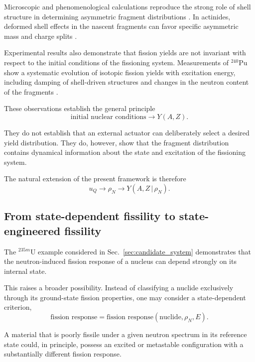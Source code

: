 Microscopic and phenomenological calculations reproduce the strong role of shell structure in determining asymmetric fragment distributions \cite{ScampsSimenel2018,Sadhukhan2022}. In actinides, deformed shell effects in the nascent fragments can favor specific asymmetric mass and charge splits \cite{ScampsSimenel2018}.

Experimental results also demonstrate that fission yields are not invariant with respect to the initial conditions of the fissioning system. Measurements of $^{240}$Pu show a systematic evolution of isotopic fission yields with excitation energy, including damping of shell-driven structures and changes in the neutron content of the fragments \cite{Ramos2026}.

These observations establish the general principle
\begin{equation}
\text{initial nuclear conditions}
\longrightarrow
Y(A,Z).
\end{equation}

They do not establish that an external actuator can deliberately select a desired yield distribution. They do, however, show that the fragment distribution contains dynamical information about the state and excitation of the fissioning system.

The natural extension of the present framework is therefore
\begin{equation}
u_Q
\longrightarrow
\rho_N
\longrightarrow
Y(A,Z\,|\,\rho_N).
\label{eq:yield_control_chain}
\end{equation}

\subsection{From state-dependent fissility to state-engineered fissility}

The $^{235m}$U example considered in Sec.~\ref{sec:candidate_system} demonstrates that the neutron-induced fission response of a nucleus can depend strongly on its internal state.

This raises a broader possibility. Instead of classifying a nuclide exclusively through its ground-state fission properties, one may consider a state-dependent criterion,
\begin{equation}
\text{fission response}
=
\text{fission response}(\text{nuclide},\rho_N,E).
\end{equation}

A material that is poorly fissile under a given neutron spectrum in its reference state could, in principle, possess an excited or metastable configuration with a substantially different fission response.

